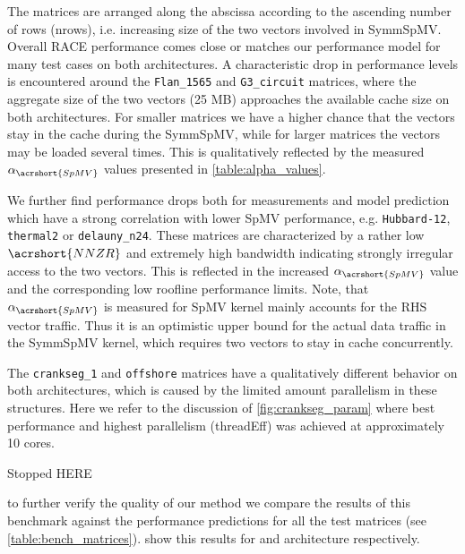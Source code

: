 The matrices are arranged along the abscissa according to the ascending number of rows (\acrshort{nrows}), i.e. increasing size of the two vectors involved in \acrshort{SymmSpMV}. Overall \acrshort{RACE}  performance comes close or matches our performance model for many test cases on both architectures. 
A characteristic drop in performance levels is encountered around the \texttt{Flan\_1565} and \texttt{G3\_circuit} matrices, where the aggregate size of the two vectors (25 MB) approaches the available cache size on both architectures. For smaller matrices we have a higher chance that the vectors stay in the cache during the \acrshort{SymmSpMV}, while for larger matrices the vectors may be loaded several times. This is qualitatively reflected by the measured $\alpha_{\acrshort{SpMV}}$ values presented in \cref{table:alpha_values}. 

We further find performance drops both for measurements and model prediction which have a strong correlation with lower \acrshort{SpMV} performance, e.g. \texttt{Hubbard-12}, \texttt{thermal2} or \texttt{delauny\_n24}. These matrices are characterized by a rather low $\acrshort{NNZR}$ and extremely high bandwidth indicating strongly irregular access to the two vectors. This is reflected in the increased $\alpha_{\acrshort{SpMV}}$ value and the corresponding low roofline performance limits. Note, that  $\alpha_{\acrshort{SpMV}}$ is measured for \acrshort{SpMV}  kernel mainly accounts for the RHS vector traffic. Thus it is an optimistic upper bound for the actual data traffic in the \acrshort{SymmSpMV} kernel, which requires two vectors to stay in cache concurrently.  

The \texttt{crankseg\_1} and \texttt{offshore} matrices have a qualitatively different behavior on both architectures, which is caused by the limited amount parallelism in these structures. Here we refer to the discussion of \cref{fig:crankseg_param} where best performance and highest parallelism (\acrshort{threadEff}) was achieved at approximately 10 cores. 

{\GW Stopped HERE} 


\Inorder to further verify the quality of our method we compare the results of this benchmark against the performance predictions for all the test matrices (see \cref{table:bench_matrices}).  show this results for \IVB and \SKX architecture respectively. 

